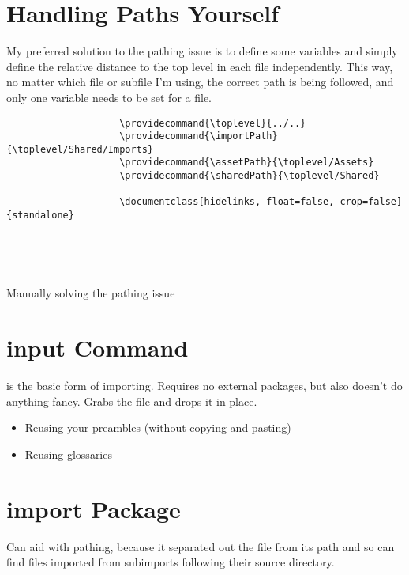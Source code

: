 \documentclass[hidelinks, float=false, crop=false]{standalone}
\begin{document}
    \section{Handling Paths Yourself}
        My preferred solution to the pathing issue is to define some variables and simply define the relative distance to the top level in each file independently.
        This way, no matter which file or subfile I'm using, the correct path is being followed, and only one variable needs to be set for a file.
        \begin{listing}[H]
            \begin{centering}
                \begin{verbatim}
                    \providecommand{\toplevel}{../..}
                    \providecommand{\importPath}{\toplevel/Shared/Imports}
                    \providecommand{\assetPath}{\toplevel/Assets}
                    \providecommand{\sharedPath}{\toplevel/Shared}

                    \documentclass[hidelinks, float=false, crop=false]{standalone}

                    
                    
                    
                \end{verbatim}
                \caption{Manually solving the pathing issue}
                \label{lst:bibliography}
            \end{centering}
        \end{listing}

    \section{input Command}
        \texttt{} is the basic form of importing. Requires no external packages, but also doesn't do anything fancy.
        Grabs the file and drops it in-place.
        \begin{itemize}
            \item Reusing your preambles (without copying and pasting)
            \item Reusing glossaries
        \end{itemize}
    \section{import Package}
        Can aid with pathing, because it separated out the file from its path and so can find files imported from subimports following their source directory.
\end{document}
